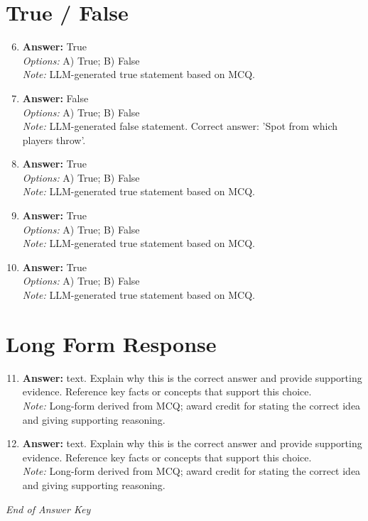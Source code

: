 \documentclass[12pt]{article}
\begin{document}
\section*{True / False}
\begin{enumerate}[label=\arabic*.]
\setcounter{enumi}{5}
\item \textbf{Answer:} True
\\ \textit{Options:} A) True; B) False
\\ \textit{Note:} LLM-generated true statement based on MCQ.
\item \textbf{Answer:} False
\\ \textit{Options:} A) True; B) False
\\ \textit{Note:} LLM-generated false statement. Correct answer: 'Spot from which players throw'.
\item \textbf{Answer:} True
\\ \textit{Options:} A) True; B) False
\\ \textit{Note:} LLM-generated true statement based on MCQ.
\item \textbf{Answer:} True
\\ \textit{Options:} A) True; B) False
\\ \textit{Note:} LLM-generated true statement based on MCQ.
\item \textbf{Answer:} True
\\ \textit{Options:} A) True; B) False
\\ \textit{Note:} LLM-generated true statement based on MCQ.
\end{enumerate}

\section*{Long Form Response}
\begin{enumerate}[label=\arabic*.]
\setcounter{enumi}{10}
\item \textbf{Answer:} text. Explain why this is the correct answer and provide supporting evidence. Reference key facts or concepts that support this choice.
\\ \textit{Note:} Long-form derived from MCQ; award credit for stating the correct idea and giving supporting reasoning.
\item \textbf{Answer:} text. Explain why this is the correct answer and provide supporting evidence. Reference key facts or concepts that support this choice.
\\ \textit{Note:} Long-form derived from MCQ; award credit for stating the correct idea and giving supporting reasoning.
\end{enumerate}

\vfill
\noindent\textit{End of Answer Key}
\end{document}

